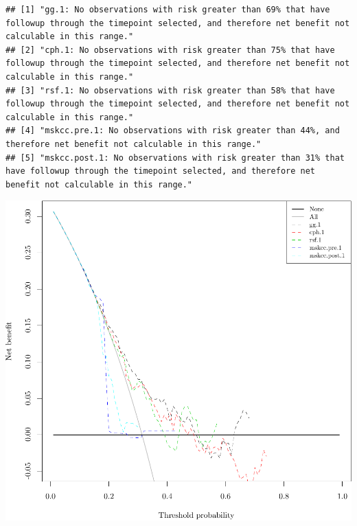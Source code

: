 \documentclass{article}\usepackage[]{graphicx}\usepackage[]{color}
\makeatletter
\def\maxwidth{ %
  \ifdim\Gin@nat@width>\linewidth
    \linewidth
  \else
    \Gin@nat@width
  \fi
}
\newenvironment{kframe}{%
 \def\at@end@of@kframe{}%
 \ifinner\ifhmode%
  \def\at@end@of@kframe{\end{minipage}}%
  \begin{minipage}{\columnwidth}%
 \fi\fi%
 \def\FrameCommand##1{\hskip\@totalleftmargin \hskip-\fboxsep
 \colorbox{shadecolor}{##1}\hskip-\fboxsep
     \hskip-\linewidth \hskip-\@totalleftmargin \hskip\columnwidth}%
 \MakeFramed {\advance\hsize-\width
   \@totalleftmargin\z@ \linewidth\hsize
   \@setminipage}}%
 {\par\unskip\endMakeFramed%
 \at@end@of@kframe}
\newenvironment{knitrout}{}{} %
\makeatother
\begin{document}
\begin{knitrout}
\begin{kframe}
\begin{alltt}
\end{alltt}
\begin{verbatim}
## [1] "gg.1: No observations with risk greater than 69% that have followup through the timepoint selected, and therefore net benefit not calculable in this range."        
## [2] "cph.1: No observations with risk greater than 75% that have followup through the timepoint selected, and therefore net benefit not calculable in this range."       
## [3] "rsf.1: No observations with risk greater than 58% that have followup through the timepoint selected, and therefore net benefit not calculable in this range."       
## [4] "mskcc.pre.1: No observations with risk greater than 44%, and therefore net benefit not calculable in this range."                                                   
## [5] "mskcc.post.1: No observations with risk greater than 31% that have followup through the timepoint selected, and therefore net benefit not calculable in this range."
\end{verbatim}
\end{kframe}

{\centering \includegraphics[width=\maxwidth]{figure/05-model-selection-dca-1} 

}



\end{knitrout}
\end{document}
